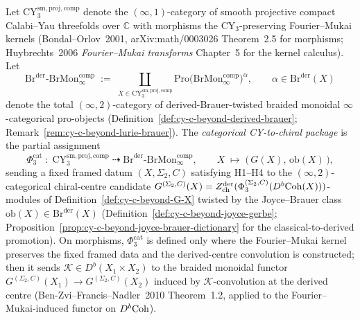 \begin{definition}
\label{def:phi-3-cat-master}
Let $\mathrm{CY}_3^{\mathrm{sm,proj,comp}}$ denote the
$(\infty,1)$-category of smooth projective compact Calabi--Yau
threefolds over $\mathbb C$ with morphisms the CY$_3$-preserving
Fourier--Mukai kernels (Bondal--Orlov~2001, arXiv:math/0003026
Theorem~2.5 for morphisms; Huybrechts~2006 \emph{Fourier--Mukai
transforms} Chapter~5 for the kernel calculus). Let
\[
 \mathrm{Br}^{\mathrm{der}}\text{-}\mathrm{BrMon}^{\mathrm{comp}}_\infty
 \;:=\;
 \coprod_{X \in \mathrm{CY}_3^{\mathrm{sm,proj,comp}}}
 \mathrm{Pro}\!\bigl(\mathrm{BrMon}^{\mathrm{comp}}_\infty\bigr)^{\alpha},
 \qquad \alpha \in \mathrm{Br}^{\mathrm{der}}(X)
\]
denote the total $(\infty,2)$-category of derived-Brauer-twisted
braided monoidal $\infty$-categorical pro-objects
(Definition~\ref{def:cy-c-beyond-derived-brauer};
Remark~\ref{rem:cy-c-beyond-lurie-brauer}). The
\emph{categorical CY-to-chiral package} is the partial assignment
\[
 \Phi_3^{\mathrm{cat}}
 \;:\;
 \mathrm{CY}_3^{\mathrm{sm,proj,comp}}
 \;\dashrightarrow\;
 \mathrm{Br}^{\mathrm{der}}\text{-}\mathrm{BrMon}^{\mathrm{comp}}_\infty,
 \qquad
 X \;\longmapsto\; \bigl(\, G(X),\, \mathrm{ob}(X) \,\bigr),
\]
sending a fixed framed datum $(X,\Sigma_2,C)$ satisfying H1--H4 to the
$(\infty,2)$-categorical chiral-centre candidate
$G^{(\Sigma_2,C)}(X) = Z^{\mathrm{der}}_{\mathrm{ch}}(\Phi_3^{(\Sigma_2,C)}(D^b\mathrm{Coh}(X)))$-modules of
Definition~\ref{def:cy-c-beyond-G-X} twisted by the Joyce--Brauer class
$\mathrm{ob}(X) \in \mathrm{Br}^{\mathrm{der}}(X)$
(Definition~\ref{def:cy-c-beyond-joyce-gerbe};
Proposition~\ref{prop:cy-c-beyond-joyce-brauer-dictionary} for the
classical-to-derived promotion). On morphisms, $\Phi_3^{\mathrm{cat}}$
is defined only where the Fourier--Mukai kernel preserves the fixed framed data and the
derived-centre convolution is constructed; then it sends
$\mathcal K \in D^b(X_1 \times X_2)$ to the braided monoidal functor
$G^{(\Sigma_2,C)}(X_1) \to G^{(\Sigma_2,C)}(X_2)$ induced by
$\mathcal K$-convolution at the derived centre
(Ben-Zvi--Francis--Nadler~2010 Theorem~1.2, applied to the
Fourier--Mukai-induced functor on $D^b\mathrm{Coh}$).
\end{definition}

